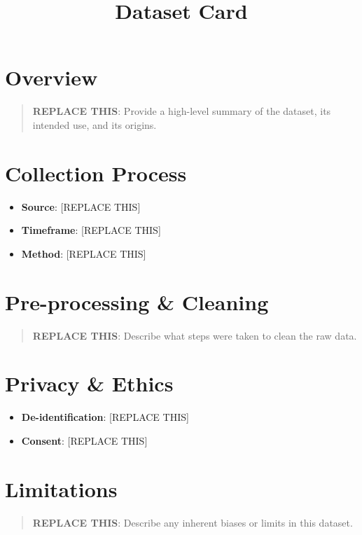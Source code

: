 \documentclass[
]{report}
\title{Dataset Card}
\author{}
\date{}
\providecommand{\tightlist}{%
  \setlength{\itemsep}{0pt}\setlength{\parskip}{0pt}}
\renewcommand*\contentsname{Table of contents}
\newcommand\contentsname{Table of contents}
\begin{document}
\maketitle

\renewcommand*\contentsname{Table of contents}
{
\hypersetup{linkcolor=}
\setcounter{tocdepth}{2}
\tableofcontents
}

\chapter{Overview}\label{overview}

\begin{quote}
\textbf{REPLACE THIS}: Provide a high-level summary of the dataset, its
intended use, and its origins.
\end{quote}

\chapter{Collection Process}\label{collection-process}

\begin{itemize}
\tightlist
\item
  \textbf{Source}: {[}REPLACE THIS{]}
\item
  \textbf{Timeframe}: {[}REPLACE THIS{]}
\item
  \textbf{Method}: {[}REPLACE THIS{]}
\end{itemize}

\chapter{Pre-processing \& Cleaning}\label{pre-processing-cleaning}

\begin{quote}
\textbf{REPLACE THIS}: Describe what steps were taken to clean the raw
data.
\end{quote}

\chapter{Privacy \& Ethics}\label{privacy-ethics}

\begin{itemize}
\tightlist
\item
  \textbf{De-identification}: {[}REPLACE THIS{]}
\item
  \textbf{Consent}: {[}REPLACE THIS{]}
\end{itemize}

\chapter{Limitations}\label{limitations}

\begin{quote}
\textbf{REPLACE THIS}: Describe any inherent biases or limits in this
dataset.
\end{quote}
\end{document}
